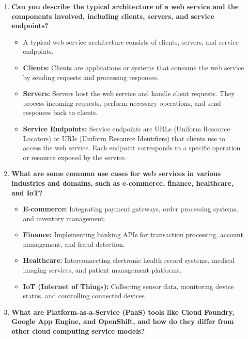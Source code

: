 \documentclass[11pt]{article}
\begin{document}
\begin{enumerate}
\begin{itemize}
\begin{itemize}
                    \end{itemize}
          \end{itemize}
    \item \textbf{Can you describe the typical architecture of a web service and the components involved, including clients, servers, and service endpoints?}\\
          \begin{itemize}
              \item A typical web service architecture consists of clients, servers, and service endpoints.
              \item \textbf{Clients:} Clients are applications or systems that consume the web service by sending requests and processing responses.
              \item \textbf{Servers:} Servers host the web service and handle client requests. They process incoming requests, perform necessary operations, and send responses back to clients.
              \item \textbf{Service Endpoints:} Service endpoints are URLs (Uniform Resource Locators) or URIs (Uniform Resource Identifiers) that clients use to access the web service. Each endpoint corresponds to a specific operation or resource exposed by the service.
          \end{itemize}
    \item \textbf{What are some common use cases for web services in various industries and domains, such as e-commerce, finance, healthcare, and IoT?}\\
          \begin{itemize}
              \item \textbf{E-commerce:} Integrating payment gateways, order processing systems, and inventory management.
              \item \textbf{Finance:} Implementing banking APIs for transaction processing, account management, and fraud detection.
              \item \textbf{Healthcare:} Interconnecting electronic health record systems, medical imaging services, and patient management platforms.
              \item \textbf{IoT (Internet of Things):} Collecting sensor data, monitoring device status, and controlling connected devices.
          \end{itemize}
    \item \textbf{What are Platform-as-a-Service (PaaS) tools like Cloud Foundry, Google App Engine, and OpenShift, and how do they differ from other cloud computing service models?}\\

\end{enumerate}
\end{document}
